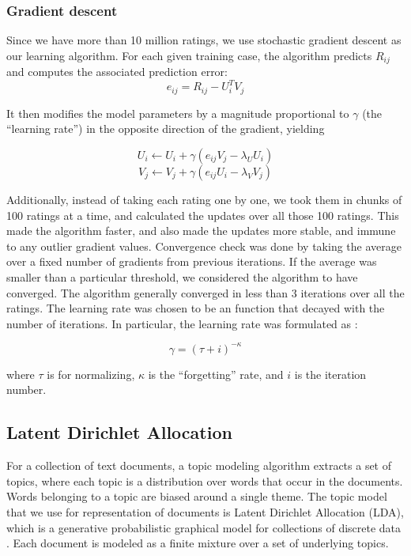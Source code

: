 \documentclass{article} %
\begin{document}
\subsubsection{Gradient descent}

Since we have more than 10 million ratings, we use stochastic gradient descent as our learning algorithm. For each given training case, the algorithm predicts $R_{ij}$ and computes the associated prediction error:
\begin{equation}
e_{ij} = R_{ij} - U_i^T V_j
\end{equation}

It then modifies the model parameters by a magnitude proportional to $\gamma$ (the ``learning rate'') in the opposite direction of the gradient, yielding

\begin{equation}
U_i \leftarrow U_i + \gamma (e_{ij} V_j - \lambda_U U_i) 
\end{equation}
\begin{equation}
V_j \leftarrow V_j + \gamma (e_{ij} U_i - \lambda_V V_j) 
\end{equation}

Additionally, instead of taking each rating one by one, we took them in chunks of 100 ratings at a time, and calculated the updates over all those 100 ratings. This made the algorithm faster, and also made the updates more stable, and immune to any outlier gradient values. Convergence check was done by taking the average over a fixed number of gradients from previous iterations. If the average was smaller than a particular threshold, we considered the algorithm to have converged. The algorithm generally converged in less than 3 iterations over all the ratings. The learning rate was chosen to be an function that decayed with the number of iterations. In particular, the learning rate was formulated as :

\begin{equation}
\gamma = (\tau + i)^{-\kappa}
\end{equation}

where $\tau$ is for normalizing, $\kappa$ is the ``forgetting'' rate, and $i$ is the iteration number.

\subsection{Latent Dirichlet Allocation}
For a collection of text documents, a topic modeling algorithm extracts a set of
topics, where each topic is a distribution over words that occur in the
documents. Words belonging to a topic are biased around a single theme. The
topic model that we use for representation of documents is Latent Dirichlet 
Allocation (LDA), which is a
generative probabilistic graphical model for collections of discrete data \cite{lda}. Each document is modeled as a finite mixture over a set of underlying topics.
\end{document}
